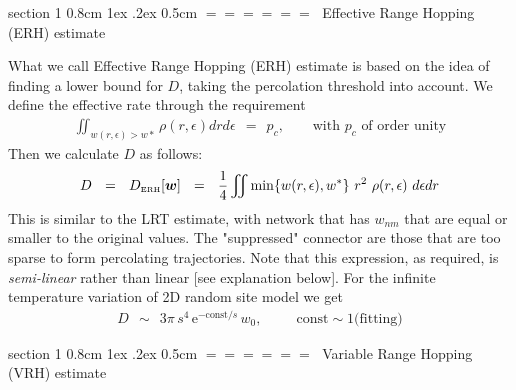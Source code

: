 \documentclass[onecolumn,fleqn,notitlepage,secnumarabic]{revtex4}
\makeatletter
\newcommand{\const}{\mbox{const}}
\newcommand{\eexp}{\mbox{e}^}
\newcommand{\tbox}[1]{\mbox{\tiny #1}}
\newcommand{\beq}{\begin{eqnarray}}
\newcommand{\eeq}{\end{eqnarray}}
\def\section{%
  \@startsection
    {section}%
    {1}%
    {\z@}%
    {0.8cm \@plus1ex \@minus .2ex}%
    {0.5cm}%
    {\Large\bf $=\!=\!=\!=\!=\!=\;$}%
}%
\makeatother
\begin{document}
\section{Effective Range Hopping (ERH) estimate}

What we call Effective Range Hopping (ERH) estimate is based 
on the idea of finding a lower bound for $D$, taking the 
percolation threshold into account. We define the effective rate 
through the requirement 
%
\beq
\iint_{w(r,\epsilon)>w*} \rho(r,\epsilon)drd\epsilon \ \ = \ \ p_c, 
\ \ \ \ \ \ \ \ \ \mbox{with $p_c$ of order unity}
\eeq
%
Then we calculate $D$ as follows:
%
\beq
D \ \ = \ \ D_{\tbox{ERH}}[\bm{w}]  \ \ = \ \ \frac{1}{4}\iint \min\{w(r,\epsilon),w^*\} \ r^2  \ \rho(r,\epsilon) \ d\epsilon dr
\eeq
%
This is similar to the LRT estimate, with network that has $w_{nm}$ 
that are equal or smaller to the original values. The "suppressed" 
connector are those that are too sparse to form percolating trajectories. 
Note that this expression, as required, is {\em semi-linear} 
rather than linear [see explanation below].
For the infinite temperature variation of 2D random site model we get  
%
\beq
D \ \ \sim \ \ 3\pi \, s^4 \, \eexp{-\const/s} \, w_0, 
\ \ \ \ \ \ \ \ \ \ \ \const\sim 1 \mbox{(fitting)} 
\eeq


\section{Variable Range Hopping (VRH) estimate}
\end{document}
